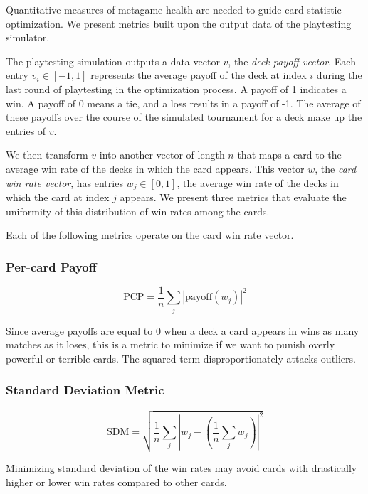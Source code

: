 \documentclass[letterpaper]{article} %
\begin{document}
Quantitative measures of metagame health are needed to guide 
card statistic optimization. We present metrics built upon the
output data of the playtesting simulator.

The playtesting simulation outputs a data vector $v$, the \emph{deck payoff vector}.
Each entry $v_i \in [-1, 1]$ represents the average payoff of
the deck at index $i$ during the last round of playtesting in
the optimization process. A payoff of 1 indicates a win. A
payoff of 0 means a tie, and a loss results in a payoff of -1.
The average of these payoffs over the course of the simulated
tournament for a deck make up the entries of $v$.

We then transform $v$ into another vector of length $n$ that maps a card to the
average win rate of the decks in which the card appears. This
vector $w$, the \emph{card win rate vector}, has entries
$w_j \in [0, 1]$, the average win rate of the decks in which
the card at index $j$ appears. We present three metrics that 
evaluate the uniformity of 
this distribution of win rates among the cards.

Each of the following metrics operate on the card win rate vector.

\subsubsection{Per-card Payoff}

\begin{equation}
	\mathrm{PCP} = \frac{1}{n} \sum_j \left|\mathrm{payoff}(w_j)\right|^2
\end{equation}

Since average payoffs are equal to 0 when a deck a card appears in wins as many matches as it loses, this is a metric to 
minimize if we want to punish overly powerful or terrible cards. The squared term disproportionately attacks outliers.

\subsubsection{Standard Deviation Metric}

\begin{equation}
	\mathrm{SDM} = \sqrt{\frac{1}{n} \sum_j \left|w_j - \left(\frac{1}{n}\sum_j w_j\right)\right|^2}
\end{equation}

Minimizing standard deviation of the win rates may avoid cards with
drastically higher or lower win rates compared to other cards.
\end{document}
